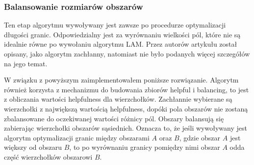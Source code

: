 \subsubsection{Balansowanie rozmiarów obszarów}
Ten etap algorytmu wywoływany jest zawsze po procedurze optymalizacji długości granic.
Odpowiedzialny jest za wyrównaniu wielkości pól, które nie są idealnie równe po
wywołaniu algorytmu LAM.
Przez autorów artykułu \cite{1364754} został opisany, jako algorytm zachłanny, natomiast nie było
podanych więcej szczegółów na jego temat.

W związku z powyższym zaimplementowałem poniższe rozwiązanie.
Algorytm również korzysta z mechanizmu do budowania zbiorów helpful i balancing, to jest z obliczania wartości
helpfulness dla wierzchołków.
Zachłannie wybierane są wierzchołki z największą wartością helpfulness, dopóki pola obszarów nie zostaną
zbalansowane do oczekiwanej wartości różnicy pól.
Obszary balansują się zabierając wierzchołki obszarów sąsiednich.
Oznacza to, że jeśli wywoływany jest algorytm optymalizacji granic między obszarami $A$ oraz $B$, gdzie obszar $A$
jest większy od obszaru $B$, to po wyrównaniu granicy pomiędzy nimi obszar $A$ odda część wierzchołków obszarowi $B$.

